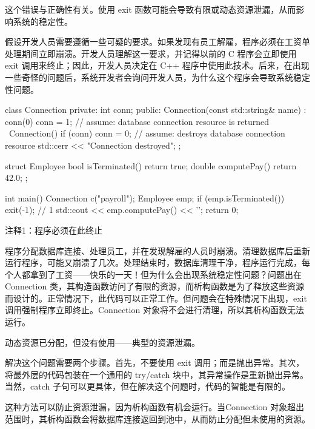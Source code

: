这个错误与正确性有关。使用 exit 函数可能会导致有限或动态资源泄漏，从而影响系统的稳定性。


假设开发人员需要遵循一些可疑的要求。如果发现有员工解雇，程序必须在工资单处理期间立即崩溃。开发人员理解这一要求，并记得以前的 C 程序会立即使用 exit 调用来终止；因此，开发人员决定在 C++ 程序中使用此技术。后来，在出现一些奇怪的问题后，系统开发者会询问开发人员，为什么这个程序会导致系统稳定性问题。


\begin{cpp}
class Connection {
private:
  int conn;
public:
  Connection(const std::string& name) : conn(0) {
    conn = 1; // assume: database connection resource is returned
  }
  ~Connection() {
    if (conn)
      conn = 0; // assume: destroys database connection resource
    std::cerr << "Connection destroyed\n";
  }
};

struct Employee {
  bool isTerminated() { return true; }
  double computePay() { return 42.0; }
};

int main() {
  Connection c("payroll");
  Employee emp;
  if (emp.isTerminated())
    exit(-1); // 1
  std::cout << emp.computePay() << '\n';
  return 0;
}
\end{cpp}

{\footnotesize
注释1：程序必须在此终止
}


程序分配数据库连接、处理员工，并在发现解雇的人员时崩溃。清理数据库后重新运行程序，可能又崩溃了几次。处理结束时，数据库清理干净，程序运行完成，每个人都拿到了工资——快乐的一天！但为什么会出现系统稳定性问题？问题出在 Connection 类，其构造函数访问了有限的资源，而析构函数是为了释放这些资源而设计的。正常情况下，此代码可以正常工作。但问题会在特殊情况下出现，exit 调用强制程序立即终止。Connection 对象将不会进行清理，所以其析构函数无法运行。

动态资源已分配，但没有使用——典型的资源泄漏。


解决这个问题需要两个步骤。首先，不要使用 exit 调用；而是抛出异常。其次，将最外层的代码包装在一个通用的 try/catch 块中，其异常操作是重新抛出异常。当然，catch 子句可以更具体，但在解决这个问题时，代码的智能是有限的。

这种方法可以防止资源泄漏，因为析构函数有机会运行。当Connection 对象超出范围时，其析构函数会将数据库连接返回到池中，从而防止分配但未使用的资源。

